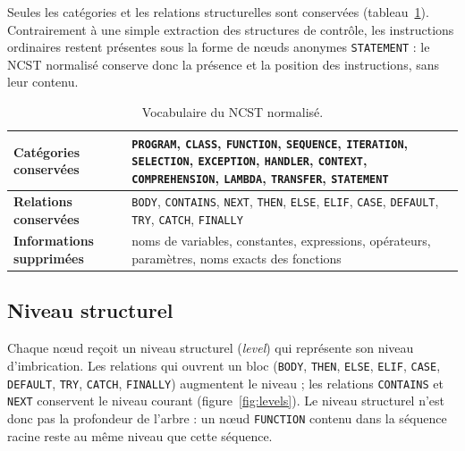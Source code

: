 \documentclass[12pt,a4paper,oneside]{report}
\begin{document}
Seules les catégories et les relations structurelles sont conservées
(tableau~\ref{tab:ncst_vocab}). Contrairement à une simple extraction des
structures de contrôle, les instructions ordinaires restent présentes sous la
forme de nœuds anonymes \texttt{STATEMENT} : le NCST normalisé conserve donc
la présence et la position des instructions, sans leur contenu.

\begin{table}[htbp]
\centering
\small
\renewcommand{\arraystretch}{1.2}
\begin{tabularx}{\textwidth}{>{\bfseries}p{3.2cm}X}
\toprule
Catégories conservées &
\texttt{PROGRAM}, \texttt{CLASS}, \texttt{FUNCTION}, \texttt{SEQUENCE},
\texttt{ITERATION}, \texttt{SELECTION}, \texttt{EXCEPTION}, \texttt{HANDLER},
\texttt{CONTEXT}, \texttt{COMPREHENSION}, \texttt{LAMBDA}, \texttt{TRANSFER},
\texttt{STATEMENT} \\
\midrule
Relations conservées &
\texttt{BODY}, \texttt{CONTAINS}, \texttt{NEXT}, \texttt{THEN}, \texttt{ELSE},
\texttt{ELIF}, \texttt{CASE}, \texttt{DEFAULT}, \texttt{TRY}, \texttt{CATCH},
\texttt{FINALLY} \\
\midrule
Informations supprimées &
noms de variables, constantes, expressions, opérateurs, paramètres, noms
exacts des fonctions \\
\bottomrule
\end{tabularx}
\caption{Vocabulaire du NCST normalisé.}
\label{tab:ncst_vocab}
\end{table}

\subsection{Niveau structurel}

Chaque nœud reçoit un niveau structurel (\emph{level}) qui représente son
niveau d'imbrication. Les relations qui ouvrent un bloc (\texttt{BODY},
\texttt{THEN}, \texttt{ELSE}, \texttt{ELIF}, \texttt{CASE}, \texttt{DEFAULT},
\texttt{TRY}, \texttt{CATCH}, \texttt{FINALLY}) augmentent le niveau ; les
relations \texttt{CONTAINS} et \texttt{NEXT} conservent le niveau courant
(figure~\ref{fig:levels}). Le niveau structurel n'est donc pas la profondeur
de l'arbre : un nœud \texttt{FUNCTION} contenu dans la séquence racine reste
au même niveau que cette séquence.
\end{document}
